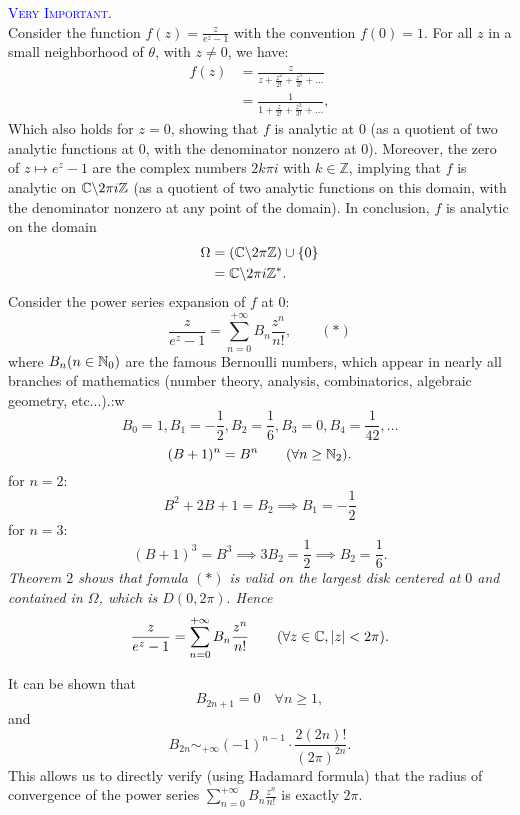 \begin{example}
   \textcolor{blue}{\textsc{Very Important}}.\\
  Consider the function  $f(z) = \frac{z}{e^{z} - 1}$ with the convention $f(0)  = 1$. For all $z$ in a small
  neighborhood of $\theta$, with $z \neq 0$, we have:
  \begin{align*}
    f(z) &= \frac{z}{z + \frac{z^2 }{2!} + \frac{z^3}{3!} + \hdots } \\
         &= 
         \frac{1}{1 + \frac{z}{2!} + \frac{z^2 }{3!} + \hdots },
  \end{align*}
  Which also holds for $z = 0$, showing that $f$ is analytic at $0$ (as a quotient of two analytic functions
  at $0$, with the denominator nonzero at $0$). Moreover, the zero of $z \mapsto  e^{z} - 1$ are the complex numbers 
  $2 k \pi i$ with $k \in  \mathbb{Z}$, implying that $f$ is analytic on $\mathbb{C}  \backslash  2 \pi  i \mathbb{Z}$ (as
  a quotient of two analytic functions on this domain, with the denominator nonzero at any point 
  of the domain). In conclusion, $f$ is analytic on the domain 
  \begin{align*}
    \Omega &= 
    \left( \mathbb{C}  \backslash  2\pi \mathbb{Z} \right) \cup \left\{ 0 \right\} \\
           &= \mathbb{C}  \backslash  2 \pi i \mathbb{Z}^{*}.
  \end{align*}
  Consider the power series expansion of $f$ at $0:$ 
  \[
  \frac{z}{e^{z} - 1} = 
  \sum_{n=0}^{+\infty} B_n \frac{z^n }{n!}, \quad \quad (*) 
  \]
  where $B_n (n \in  \mathbb{N}_0) $ are the famous Bernoulli numbers, which appear in nearly all branches of mathematics
  (number theory, analysis, combinatorics, algebraic geometry, etc...).:w
  \[
  B_0 = 1, B_1 = -\frac{1}{2}, B_2 = \frac{1}{6}, B_3 = 0, 
  B_4= \frac{1}{42}, \hdots 
  \]
  \[
    (B + 1) ^n  = B^n  \quad \quad (\forall  n \geq \mathbb{N}_2).
  \]
  for $n = 2:$ 
  \[
  B^2  + 2B + 1 = B_2 \implies B_1 = -\frac{1}{2}
  \]
  for $n = 3:$ 
  \[
    (B + 1) ^3  = B^3  \implies 
    3 B_2 = \frac{1}{2} \implies B_2 = \frac{1}{6}.
  \]
  \it Theorem $2$ \normalfont shows that fomula $(*) $ is valid on the largest disk centered
  at $0$ and contained in $\Omega$, which is $D(0, 2\pi). $ Hence
  \[
    \frac{z}{e^{z} - 1} = 
    \sum_{n=0}^{+\infty} B_n \frac{z^n }{n!} \quad \quad (\forall z \in  \mathbb{C}, \left| z \right|  < 2\pi   ).
  \]
\end{example}
\begin{remark}
  It can be shown that 
  \[
  B_{2n+1} = 0 \quad \forall n \geq 1,
  \]
  and 
  \[
  B_{2n} \sim_{+\infty } (-1) ^{n-1} \cdot \frac{2 (2n) !}{(2\pi ) ^{2n}}.
  \]
  This allows us to directly verify (using Hadamard formula) that the radius of convergence of the power series $\sum_{n=0}^{+\infty} B _n \frac{z^n }{n!}$ is exactly $2\pi .$ 
\end{remark}

